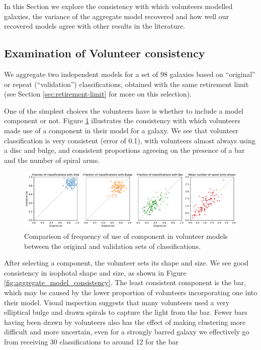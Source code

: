 \documentclass[../main.tex]{subfiles}
\begin{document}
\label{sec:results}

In this Section we explore the consistency with which volunteers modelled galaxies, the variance of the aggregate model recovered and how well our recovered models agree with other results in the literature.


\subsection{Examination of Volunteer consistency}
We aggregate two independent models for a set of 98 galaxies based on ``original'' or repeat (``validation'') classifications, obtained with the same retirement limit (see Section \ref{sec:retirement-limit} for more on this selection).

One of the simplest choices the volunteers have is whether to include a model component or not. Figure \ref{fig:volunteer_component_consistency} illustrates the consistency with which volunteers made use of a component in their model for a galaxy. We see that volunteer classification is very consistent (error of 0.1), with volunteers almost always using a disc and bulge, and consistent proportions agreeing on the presence of a bar and the number of spiral arms.

\begin{figure}
  \includegraphics[width=17.3cm]{images__results/component_frequency.pdf}
  \caption{Comparison of frequency of use of component in volunteer models between the original and validation sets of classifications.}
  \label{fig:volunteer_component_consistency}
\end{figure}

After selecting a component, the volunteer sets its shape and size. We see good consistency in isophotal shape and size, as shown in Figure \ref{fig:aggregate_model_consistency}. The least consistent component is the bar, which may be caused by the lower proportion of volunteers incorporating one into their model. Visual inspection suggests that many volunteers used a very elliptical bulge and drawn spirals to capture the light from the bar. Fewer bars having been drawn by volunteers also has the effect of making clustering more difficult and more uncertain, even for a strongly barred galaxy we effectively go from receiving 30 classifications to around 12 for the bar
\end{document}
